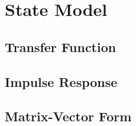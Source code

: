 \section*{State Model}
\subsection*{Transfer Function}
\subsection*{Impulse Response}
\subsection*{Matrix-Vector Form}